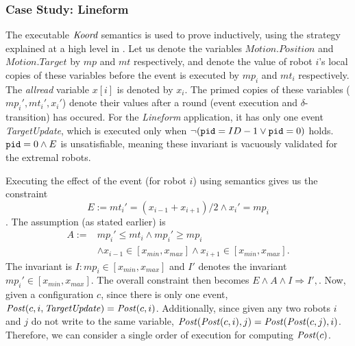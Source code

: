 
\subsubsection*{Case Study: Lineform}
The executable $\emph{Koord}$ semantics is used to prove  inductively, using the strategy explained at a high level in . Let us denote the variables $\mathit{Motion.Position}$ and $\mathit{Motion.Target}$ by $\mathit{mp}$ and $\mathit{mt}$ respectively,  and denote the value of robot $i$'s local copies of these variables before the event is executed by $\mathit{mp}_i$ and $\mathit{mt}_i$ respectively. The \emph{allread} variable $x[i]$ is denoted by $x_i$. The primed copies of these variables ($\mathit{mp_i', mt_i',x_i'}$) denote their values after a round (event execution and $\delta$-transition) has occured. For the \emph{Lineform} application, it has only one event \emph{TargetUpdate}, which is executed only when $\neg (\texttt{pid} = ID - 1 \vee \texttt{pid} = 0)$ holds. $\texttt{pid} = 0 \wedge E$ is unsatisfiable, meaning these invariant is vacuously validated for the extremal robots.


Executing the effect of the event (for robot $i$) using \K semantics gives us the constraint $$E := mt_i' = (x_{i-1} + x_{i+1})/2  \wedge x_i' = mp_i$$.  The assumption (as stated earlier) is \begin{align*}A := &mp_i' \leq mt_i \wedge mp_i' \geq mp_i \\ &\wedge  x_{i-1} \in [x_{min}, x_{max}] \wedge x_{i+1}\in [x_{min},x_{max}].\end{align*} The invariant is $I: \mathit{mp}_i \in [x_{min}, x_{max}]$ and $I'$ denotes the invariant $\mathit{mp}_i' \in [x_{min}, x_{max}].$  The overall constraint then becomes $E \wedge A \wedge I \Rightarrow I',$. Now, given a configuration $c$, since there is only one event, $\mathit{Post}(c,i,\mathit{TargetUpdate}) = \mathit{Post}(c,i)$. Additionally, since given any two robots $i$ and $j$ do not write to the same variable, $\mathit{Post}(\mathit{Post}(c,i), j) = \mathit{Post}(\mathit{Post}(c,j),i)$. Therefore, we can consider a single order of execution for computing $\mathit{Post}(c)$.

